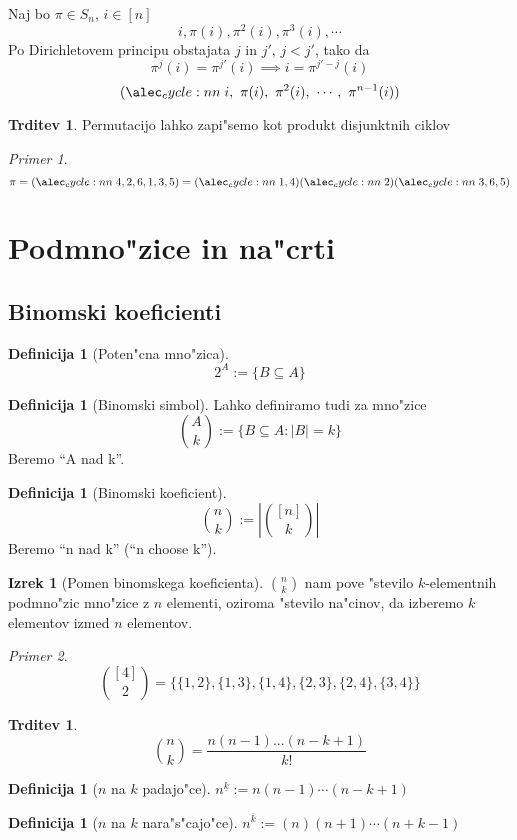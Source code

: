 \documentclass[a4paper,12pt]{article}
\theoremstyle{definition}
\newtheorem{defn}[counter]{Definicija}
\newtheorem{claim}[counter]{Trditev}
\newtheorem{theorem}[counter]{Izrek}
\theoremstyle{remark}
\newtheorem*{ex}{Primer}
\begin{document}
\label{TODO: what is this}
Naj bo $\pi \in S_n$, $i \in [n]$
\[i, \pi (i), \pi^2(i), \pi^3(i), \cdots\]
Po Dirichletovem principu obstajata $j$ in $j'$, $j < j'$, tako da 
\[ \pi^j(i) = \pi^{j'}(i) \implies i = \pi^{j'-j}(i) \]
\[\cycle{i,\ \pi(i),\ \pi^2(i),\ \cdots,\ \pi^{n - 1}(i)}\]
\begin{claim}
	Permutacijo lahko zapi"semo kot produkt disjunktnih ciklov
\end{claim}
\begin{ex}
	\[\pi = \cycle{4,2,6,1,3,5} = \cycle{1, 4}\cycle{2}\cycle{3,6,5}\]
\end{ex}

\section{Podmno"zice in na"crti}
\subsection{Binomski koeficienti}
\begin{defn}[Poten"cna mno"zica]
	\[2^A := \{B \subseteq A\}\]
\end{defn}
\begin{defn}[Binomski simbol]
	Lahko definiramo tudi za mno"zice
	\[\binom{A}{k} := \{B \subseteq A: |B| = k\}\]
	Beremo ``A  nad k''.
\end{defn}
\begin{defn}[Binomski koeficient]
	\[\binom{n}{k} := |\binom{[n]}{k}|\]
	Beremo ``n nad k'' (``n choose k'').
\end{defn}

\begin{theorem}[Pomen binomskega koeficienta]
	$\binom{n}{k}$ nam pove "stevilo $k$-elementnih podmno"zic mno"zice z $n$ elementi, oziroma "stevilo na"cinov, da izberemo $k$ elementov izmed $n$ elementov.
\end{theorem}
\begin{ex}
	\[\binom{[4]}{2} = \{\{1, 2\}, \{1, 3\}, \{1, 4\}, \{2, 3\}, \{2, 4\}, \{3, 4\}\}\]
\end{ex}

\begin{claim}
	\[\binom{n}{k}=\frac{n(n-1)...(n-k+1)}{k!}\]
\end{claim}
\begin{defn}[$n$ na $k$ padajo"ce]
	$n^{\underline{k}} := n(n-1)\cdots(n-k+1)$\\
\end{defn}
\begin{defn}[$n$ na $k$ nara"s"cajo"ce]
	$n^{\overline{k}} := (n)(n+1)\cdots(n+k-1)$
\end{defn}
\end{document}

